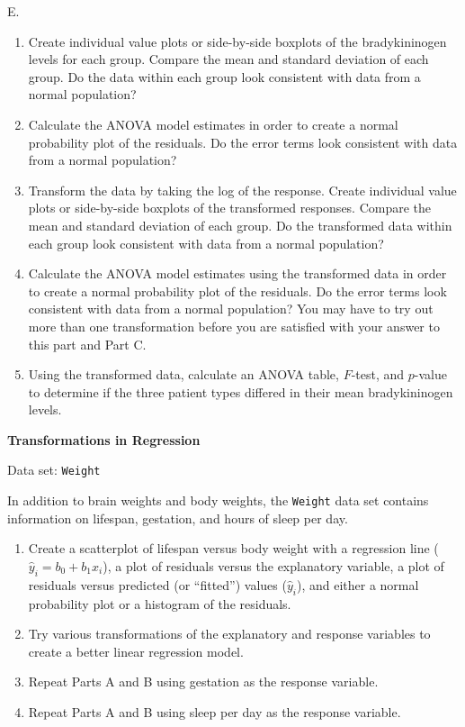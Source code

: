 \documentclass[
]{report}
\newcounter{excount}
\renewcommand{\theexcount}{E\arabic{excount}}
\begin{document}
\begin{list}{\theexcount.}{ \setlength{\itemsep}{1.2em}}
    \begin{enumerate}
      \item Create individual value plots or side-by-side boxplots of the bradykininogen levels for each group. Compare the mean and standard deviation of each group. Do the data within each group look consistent with data from a normal population?
      \item Calculate the ANOVA model estimates in order to create a normal probability plot of the residuals. Do the error terms look consistent with data from a normal population?
      \item Transform the data by taking the log of the response. Create individual value plots or side-by-side boxplots of the transformed responses. Compare the mean and standard deviation of each group. Do the transformed data within each group look consistent with data from a normal population?
      \item Calculate the ANOVA model estimates using the transformed data in order to create a normal probability plot of the residuals. Do the error terms look consistent with data from a normal population? You may have to try out more than one transformation before you are satisfied with your answer to this part and Part C.
      \item Using the transformed data, calculate an ANOVA table, $F$-test, and $p$-value to determine if the three patient types differed in their mean bradykininogen levels.
    \end{enumerate}

  \item \textbf{Transformations in Regression}

Data set: \texttt{Weight}

In addition to brain weights and body weights, the \texttt{Weight} data set contains information on lifespan, gestation, and hours of sleep per day.

    \begin{enumerate}
      \item Create a scatterplot of lifespan versus body weight with a regression line ($\hat{y}_i = b_0 + b_1 x_i$), a plot of residuals versus the explanatory variable, a plot of residuals versus predicted (or “fitted”) values ($\hat{y}_i$), and either a normal probability plot or a histogram of the residuals.
      \item Try various transformations of the explanatory and response variables to create a better linear regression model.
      \item Repeat Parts A and B using gestation as the response variable.
      \item Repeat Parts A and B using sleep per day as the response variable.
    \end{enumerate}


\end{list}
\end{document}
